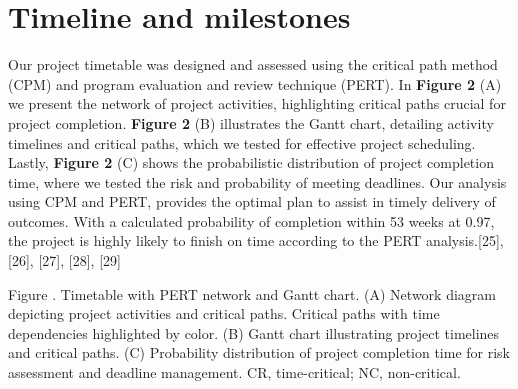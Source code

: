 
\section{Timeline and milestones}\label{timetable-analysis}

Our project timetable was designed and assessed using the critical path
method (CPM) and program evaluation and review technique (PERT). In
\textbf{Figure 2} (A) we present the network of project activities,
highlighting critical paths crucial for project completion.
\textbf{Figure 2} (B) illustrates the Gantt chart, detailing activity
timelines and critical paths, which we tested for effective project
scheduling. Lastly, \textbf{Figure 2} (C) shows the probabilistic
distribution of project completion time, where we tested the risk and
probability of meeting deadlines. Our analysis using CPM and PERT,
provides the optimal plan to assist in timely delivery of outcomes. With
a calculated probability of completion within 53 weeks at 0.97, the
project is highly likely to finish on time according to the PERT
analysis.{[}25{]}, {[}26{]}, {[}27{]}, {[}28{]}, {[}29{]}

Figure . Timetable with PERT network and Gantt chart. (A) Network
diagram depicting project activities and critical paths. Critical paths
with time dependencies highlighted by color. (B) Gantt chart
illustrating project timelines and critical paths. (C) Probability
distribution of project completion time for risk assessment and deadline
management. CR, time-critical; NC, non-critical.